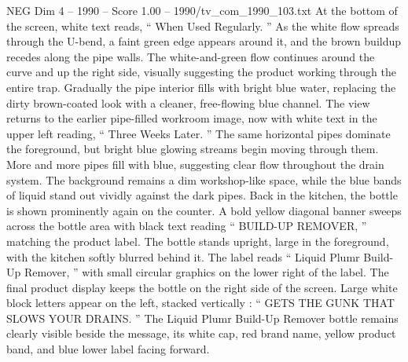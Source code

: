 \begin{textsample}{NEG Dim 4 – 1990 – Score 1.00 – 1990/tv\_com\_1990\_103.txt}
At the bottom of the screen, white text reads, “ When Used Regularly. ” As the white flow spreads through the U-bend, a faint green edge appears around it, and the brown buildup recedes along the pipe walls.
The white-and-green flow continues around the curve and up the right side, visually suggesting the product working through the entire trap.
Gradually the pipe interior fills with bright blue water, replacing the dirty brown-coated look with a cleaner, free-flowing blue channel.
The view returns to the earlier pipe-filled workroom image, now with white text in the upper left reading, “ Three Weeks Later. ” The same horizontal pipes dominate the foreground, but bright blue glowing streams begin moving through them.
More and more pipes fill with blue, suggesting clear flow throughout the drain system.
The background remains a dim workshop-like space, while the blue bands of liquid stand out vividly against the dark pipes.
Back in the kitchen, the bottle is shown prominently again on the counter.
A bold yellow diagonal banner sweeps across the bottle area with black text reading “ BUILD-UP REMOVER, ” matching the product label.
The bottle stands upright, large in the foreground, with the kitchen softly blurred behind it.
The label reads “ Liquid Plumr Build-Up Remover, ” with small circular graphics on the lower right of the label.
The final product display keeps the bottle on the right side of the screen.
Large white block letters appear on the left, stacked vertically : “ GETS THE GUNK THAT SLOWS YOUR DRAINS. ” The Liquid Plumr Build-Up Remover bottle remains clearly visible beside the message, its white cap, red brand name, yellow product band, and blue lower label facing forward.

\end{textsample}
